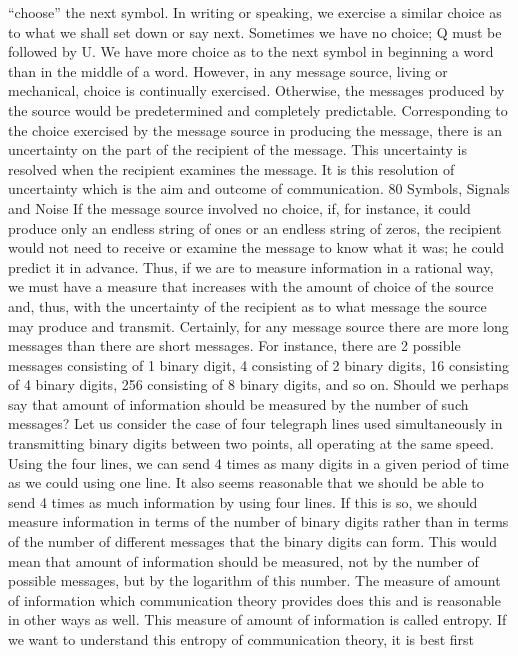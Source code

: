 “choose” the next symbol.
In writing or speaking, we exercise a similar choice as to what
we shall set down or say next. Sometimes we have no choice; Q
must be followed by U. We have more choice as to the next
symbol in beginning a word than in the middle of a word. However,
in any message source, living or mechanical, choice is continually
exercised. Otherwise, the messages produced by the source
would be predetermined and completely predictable.
Corresponding to the choice exercised by the message source in
producing the message, there is an uncertainty on the part of the
recipient of the message. This uncertainty is resolved when the
recipient examines the message. It is this resolution of uncertainty
which is the aim and outcome of communication.
80
Symbols, Signals and Noise
If the message source involved no choice, if, for instance, it
could produce only an endless string of ones or an endless string
of zeros, the recipient would not need to receive or examine the
message to know what it was; he could predict it in advance. Thus,
if we are to measure information in a rational way, we must have
a measure that increases with the amount of choice of the source
and, thus, with the uncertainty of the recipient as to what message
the source may produce and transmit.
Certainly, for any message source there are more long messages
than there are short messages. For instance, there are 2 possible
messages consisting of 1 binary digit, 4 consisting of 2 binary
digits, 16 consisting of 4 binary digits, 256 consisting of 8 binary
digits, and so on. Should we perhaps say that amount of information
should be measured by the number of such messages? Let us
consider the case of four telegraph lines used simultaneously in
transmitting binary digits between two points, all operating at the
same speed. Using the four lines, we can send 4 times as many
digits in a given period of time as we could using one line. It also
seems reasonable that we should be able to send 4 times as much
information by using four lines. If this is so, we should measure
information in terms of the number of binary digits rather than
in terms of the number of different messages that the binary digits
can form. This would mean that amount of information should be
measured, not by the number of possible messages, but by the
logarithm of this number.
The measure of amount of information which communication
theory provides does this and is reasonable in other ways as well.
This measure of amount of information is called entropy. If we want
to understand this entropy of communication theory, it is best first
